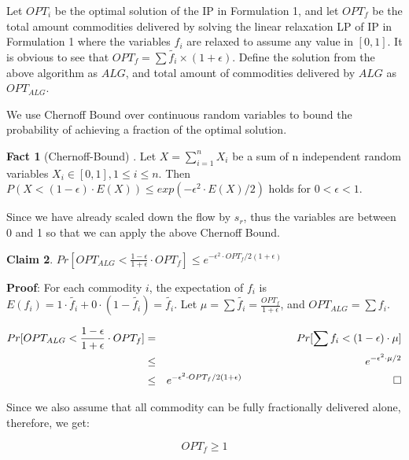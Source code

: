 \documentclass[onecolumn,11pt,journal, compsoc]{IEEEtran}
\newcommand*{\QEDB}{\hfill\ensuremath{\square}}%
\begin{document}
	
	
Let $OPT_i$ be the optimal solution of the IP in Formulation 1, and let $OPT_f$ be the total amount commodities delivered by solving the linear relaxation LP of IP in Formulation 1 where the variables $f_i$ are relaxed to assume any value in $[0, 1]$. It is obvious to see that $OPT_f = \sum{\tilde{f_i}} \times (1+\epsilon)$. Define the solution from the above algorithm as $ALG$, and total amount of commodities delivered by $ALG$ as $OPT_{ALG}$. 

We use Chernoff Bound over continuous random variables to bound the probability of achieving a fraction of the optimal solution.

\textbf{Fact 1} (Chernoff-Bound)\label{CB} . Let $X=\sum_{i=1}^{n}X_i$ be a sum of n independent random variables $X_i \in [0,1], 1\le i \le n$. Then $P(X<(1-\epsilon) \cdot E(X)) \le exp(-\epsilon^2 \cdot E(X)/2)$ holds for $0 < \epsilon < 1$.

Since we have already scaled down the flow by $s_r$, thus the variables are between 0 and 1 so that we can apply the above Chernoff Bound.

\vspace*{0.15in}
\textbf{Claim 2}. $Pr[OPT_{ALG} < \frac{1-\epsilon}{1+\epsilon} \cdot OPT_f] \le e^{-\epsilon^2 \cdot OPT_f / 2(1+\epsilon)}$ 
\vspace*{0.15in}

\textbf{Proof}: For each commodity $i$, the expectation of $f_i$ is $E(f_i) = 1 \cdot \tilde{f_i} + 0 \cdot (1-\tilde{f_i}) = \tilde{f_i}$. Let $\mu = \sum{\tilde{f_i}} = \frac{OPT_f}{1+\epsilon}$, and $OPT_{ALG} = \sum{f_i}$.

\begin{eqnarray} \label{OPTALG}
Pr[OPT_{ALG}  < \frac{1-\epsilon}{1+\epsilon} \cdot OPT_f] &=& Pr[\sum{f_i} < (1-\epsilon) \cdot \mu] \\ \nonumber
&\le& e^{-\epsilon^2 \cdot \mu /2} \\ \nonumber
&\le& e^{-\epsilon^2 \cdot OPT_f / 2(1+\epsilon)}  \,\,\,\,\,\,\,\,\,\,\,\,\,\,\,\,\,\,\,\,\,\,\,\,\,\,\,\,\,\,\,\,\,\,\,\,\,\,\,\,\,\,\,\,\,\,\,\,\,\,\,\,\,\,\,\,\,\,\,\,\,\,\,\,\,\,\,\,\,\,\,\,\,\,\,\,\,\,\,\,\,\,\,\,\,\QEDB \nonumber
\end{eqnarray}

 Since we also assume that all commodity can be fully fractionally delivered alone, therefore, we get:

\begin{equation} \label{OPTF}
	OPT_{f} \ge 1
\end{equation}
\end{document}
